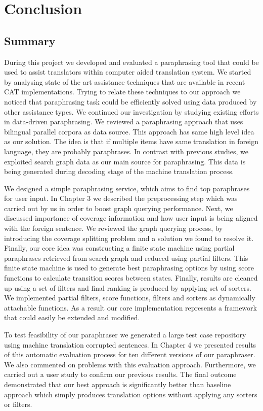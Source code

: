 
\chapter{Conclusion}

\section{Summary}

During this project we developed and evaluated a paraphrasing tool that could be used to assist translators within computer aided translation system. We started by analysing state of the art assistance techniques that are available in recent CAT implementations. Trying to relate these techniques to our approach we noticed that paraphrasing task could be efficiently solved using data produced by other assistance types. We continued our investigation by studying existing efforts in data-driven paraphrasing. We reviewed a paraphrasing approach that uses bilingual parallel corpora as data source. This approach has same high level idea as our solution. The idea is that if multiple items have same translation in foreign language, they are probably paraphrases. In contrast with previous studies, we exploited search graph data as our main source for paraphrasing. This data is being generated during decoding stage of the machine translation process.

We designed a simple paraphrasing service, which aims to find top paraphrases for user input. In Chapter 3 we described the preprocessing step which was carried out by us in order to boost graph querying performance. Next, we discussed importance of coverage information and how user input is being aligned with the foreign sentence. We reviewed the graph querying process, by introducing the coverage splitting problem and a solution we found to resolve it. Finally, our core idea was constructing a finite state machine using partial paraphrases retrieved from search graph and reduced using partial filters. This finite state machine is used to generate best paraphrasing options by using score functions to calculate transition scores between states. Finally, results are cleaned up using a set of filters and final ranking is produced by applying set of sorters. We implemented partial filters, score functions, filters and sorters as dynamically attachable functions. As a result our core implementation represents a framework that could easily be extended and modified. 

To test feasibility of our paraphraser we generated a large test case repository using machine translation corrupted sentences. In Chapter 4 we presented results of this automatic evaluation process for ten different versions of our paraphraser. We also commented on problems with this evaluation approach. Furthermore, we carried out a user study to confirm our previous results. The final outcome demonstrated that our best approach is significantly better than baseline approach which simply produces translation options without applying any sorters or filters.

